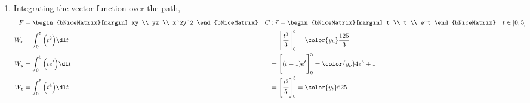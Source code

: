 \begin{enumerate}
    \item Integrating the vector function over the path,
          \begin{align}
              F   & = \begin{bNiceMatrix}[margin]
                          xy \\ yz \\ x^2y^2
                      \end{bNiceMatrix}           &
              C   & : \vec{r} = \begin{bNiceMatrix}[margin]
                                    t \\ t \\ e^t
                                \end{bNiceMatrix} \quad t \in [0, 5] \\
              W_x & = \int_{0}^{5} \Big( t^2 \Big) \dl t    &
                  & = \Bigg[ \frac{t^3}{3} \Bigg]_0^{5}
              = \color{y_h} \frac{125}{3}                            \\
              W_y & = \int_{0}^{5} \Big( t e^t \Big) \dl t  &
                  & = \Bigg[ (t - 1)e^t \Bigg]_0^{5}
              = \color{y_p} 4e^5 + 1                                 \\
              W_z & = \int_{0}^{5} \Big( t^4 \Big) \dl t    &
                  & = \Bigg[ \frac{t^5}{5} \Bigg]_0^{5}
              = \color{y_t} 625
          \end{align}
\end{enumerate}